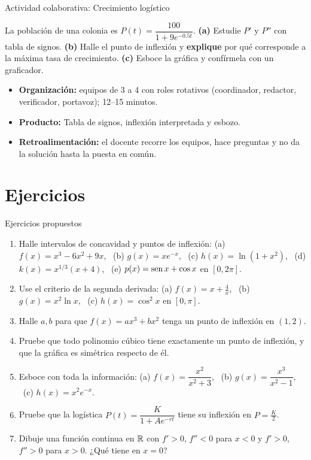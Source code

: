 \documentclass[10pt,aspectratio=169]{beamer}
\begin{document}
\begin{frame}{Actividad colaborativa: Crecimiento logístico}
  \small
  \begin{activa}
    La población de una colonia es $P(t)=\dfrac{100}{1+9e^{-0.5t}}$. \textbf{(a)} Estudie $P'$ y $P''$ con tabla de signos. \textbf{(b)} Halle el punto de inflexión y \textbf{explique} por qué corresponde a la máxima tasa de crecimiento. \textbf{(c)} Esboce la gráfica y confírmela con un graficador.
  \end{activa}
  \begin{itemize}
    \item \textbf{Organización:} equipos de 3 a 4 con roles rotativos (coordinador, redactor, verificador, portavoz); 12--15 minutos.
    \item \textbf{Producto:} Tabla de signos, inflexión interpretada y esbozo.
    \item \textbf{Retroalimentación:} el docente recorre los equipos, hace preguntas y no da la solución hasta la puesta en común.
  \end{itemize}
\end{frame}

\section{Ejercicios}

\begin{frame}{Ejercicios propuestos}
  \small
  \begin{ejercicio}
    \begin{enumerate}
      \item Halle intervalos de concavidad y puntos de inflexión: (a) $f(x)=x^3-6x^2+9x$, \ (b) $g(x)=xe^{-x}$, \ (c) $h(x)=\ln(1+x^2)$,
        \ (d) $k(x)=x^{1/3}(x+4)$, \ (e) $p(x)=\operatorname{sen} x+\cos x$ en $[0,2\pi]$.
      \item Use el criterio de la segunda derivada: (a) $f(x)=x+\frac4x$, \ (b) $g(x)=x^2\ln x$, \ (c) $h(x)=\cos^2x$ en $[0,\pi]$.
      \item Halle $a,b$ para que $f(x)=ax^3+bx^2$ tenga un punto de inflexión en $(1,2)$.
      \item Pruebe que todo polinomio cúbico tiene exactamente un punto de inflexión, y que la gráfica es simétrica respecto de él.
      \item Esboce con toda la información: (a) $f(x)=\dfrac{x^2}{x^2+3}$, \ (b) $g(x)=\dfrac{x^3}{x^2-1}$, \ (c) $h(x)=x^2e^{-x}$.
      \item Pruebe que la logística $P(t)=\dfrac{K}{1+Ae^{-rt}}$ tiene su inflexión en $P=\frac K2$.
      \item Dibuje una función continua en $\mathbb{R}$ con $f'>0$, $f''<0$ para $x<0$ y $f'>0$, $f''>0$ para $x>0$. ¿Qué tiene en $x=0$?
    \end{enumerate}
  \end{ejercicio}
\end{frame}
\end{document}
